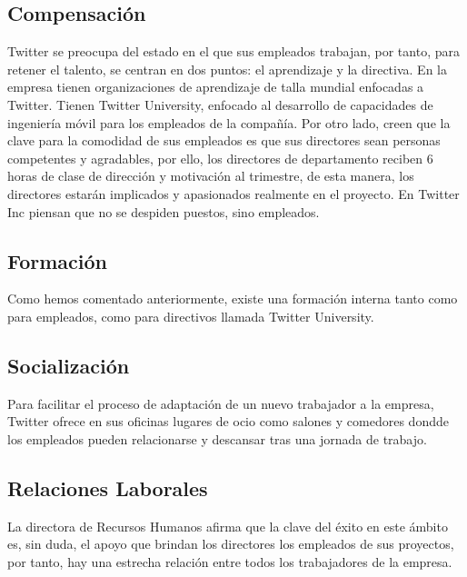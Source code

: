\subsection{Compensación}

Twitter se preocupa del estado en el que sus empleados trabajan, por tanto, para retener el talento, se centran en dos puntos: el aprendizaje y la directiva.
En la empresa tienen organizaciones de aprendizaje de talla mundial enfocadas a Twitter. Tienen Twitter University, enfocado al desarrollo de capacidades de ingeniería móvil para los empleados de la compañía. Por otro lado, creen que la clave para la comodidad de sus empleados es que sus directores sean personas competentes y agradables, por ello, los directores de departamento reciben 6 horas de clase de dirección y motivación al trimestre, de esta manera, los directores estarán implicados y apasionados realmente en el proyecto. En Twitter Inc piensan que no se despiden puestos, sino empleados.

\subsection{Formación}

Como hemos comentado anteriormente, existe una formación interna tanto como para empleados, como para directivos llamada Twitter University.

\subsection{Socialización}

Para facilitar el proceso de adaptación de un nuevo trabajador a la empresa, Twitter ofrece en sus oficinas lugares de ocio como salones y comedores dondde los empleados pueden relacionarse y descansar tras una jornada de trabajo.

\subsection{Relaciones Laborales}

La directora de Recursos Humanos afirma que la clave del éxito en este ámbito es, sin duda, el apoyo que brindan los directores los empleados de sus proyectos, por tanto, hay una estrecha relación entre todos los trabajadores de la empresa.